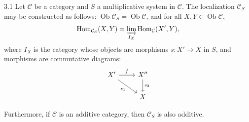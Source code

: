 \begin{bookproposition}{3.1}\label{prop:1.3.1}
Let $\mathcal{C}$ be a category and $S$ a multiplicative system in $\mathcal{C}$. The localization $\mathcal{C}_S$ may be constructed as follows:
$\operatorname{Ob}\mathcal{C}_S = \operatorname{Ob}\mathcal{C}$, and for all $X,Y\in\operatorname{Ob}\mathcal{C}$,
\[
\operatorname{Hom}_{\mathcal{C}_S}(X,Y) = \varinjlim_{I_X} \operatorname{Hom}_{\mathcal{C}}(X',Y),
\]
where $I_X$ is the category whose objects are morphisms $s\colon X'\to X$ in $S$, and morphisms are commutative diagrams:
\[
\begin{tikzcd}
	X' \arrow[dr, "s_1"'] \arrow[r, "f"] & X'' \arrow[d, "s_2"] \\
	& X
\end{tikzcd}
\]

Furthermore, if $\mathcal{C}$ is an additive category, then $\mathcal{C}_S$ is also additive.
\end{bookproposition}


